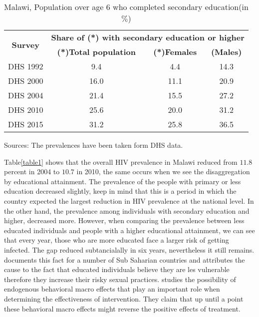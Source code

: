\begin{table}[H]
\centering
\caption{Malawi, Population over age 6 who completed secondary education(in $\%$)}
\label{table2}
\begin{tabular}{c|c|c|c}
\hline
\multirow{2}{*}{\textbf{Survey}}&\multicolumn{3}{|c}{\textbf{Share of (*) with secondary education or higher}}\\
\cline{2-4}
 &   \textbf{(*)Total population}&  \textbf{(*)Females}&  \textbf{(Males)}\\
 \hline \hline
 DHS 1992& 9.4 & 4.4 & 14.3 \\
 [0.3em]
 DHS 2000& 16.0 & 11.1 & 20.9 \\
  [0.3em]
 DHS 2004& 21.4 & 15.5 & 27.2 \\
  [0.3em]
 DHS 2010& 25.6 & 20.0 & 31.2 \\
  [0.3em]
 DHS 2015& 31.2 & 25.8 & 36.5 \\
\hline \hline
\end{tabular}
\begin{flushleft}
Sources: The prevalences have been taken form DHS data.
\end{flushleft}
\end{table}

Table\ref{table1} shows that the overall HIV prevalence in Malawi reduced from  $11.8$ percent in 2004 to $10.7$ in 2010, the same occurs when we see the disaggregation by educational attainment. The prevalence of the people with primary or less education decreased slightly, keep in mind that this is a period in which the country expected the largest reduction in HIV prevalence at the national level. In the other hand, the prevalence among individuals with secondary education and higher, decreased more. However, when comparing the prevalence between less educated individuals and people with a higher educational attainment, we can see that every year, those who are more educated face a larger risk of getting infected. The gap reduced subtancialally in six years, nevertheless it still remains. \cite{raul} documents this fact for 
a number of Sub Saharian countries and attributes the cause to the fact that educated individuals believe they are les vulnerable therefore they increase their risky sexual practices.\cite{michelle} studies the possibility of endogenous behavioral macro effects that play an important role when determining the effectiveness of intervention. They claim that up until a point these behavioral macro effects might reverse the positive effects of treatment. \\

